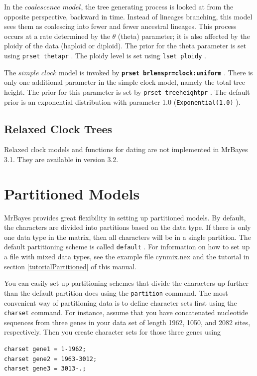 \documentclass[12pt]{book}
\newcommand{\ttt}[1]{\texttt{#1} }
\newcommand{\tb}[1]{\texttt{\textbf{#1}} }
\begin{document}
In the $coalescence$ $model$, the tree generating process is looked at from the opposite
perspective, backward in time. Instead of lineages branching, this model sees them as
coalescing into fewer and fewer ancestral lineages. This process occurs at a rate
determined by the $\theta$ (theta) parameter; it is also affected by the ploidy of the data
(haploid or diploid). The prior for the theta parameter is set using \ttt{prset thetapr}.
The ploidy level is set using \ttt{lset ploidy}.

The $simple$ $clock$ model is invoked by \tb{prset brlenspr=clock:uniform}. There is
only one additional parameter in the simple clock model, namely the total tree height.
The prior for this parameter is set by \ttt{prset treeheightpr}. The default prior is an
exponential distribution with parameter 1.0 (\ttt{Exponential(1.0)}).

\subsection{Relaxed Clock Trees}
Relaxed clock models and functions for dating are not implemented in MrBayes 3.1.
They are available in version 3.2.

\section{Partitioned Models}
MrBayes provides great flexibility in setting up partitioned models. By default, the
characters are divided into partitions based on the data type. If there is only one data type
in the matrix, then all characters will be in a single partition. The default partitioning
scheme is called \ttt{default}. For information on how to set up a file with mixed data
types, see the example file cynmix.nex and the tutorial in section \ref{tutorialPartitioned} of this manual.

You can easily set up partitioning schemes that divide the characters up further than the
default partition does using the \ttt{partition} command. The most convenient way of
partitioning data is to define character sets first using the \ttt{charset} command. For
instance, assume that you have concatenated nucleotide sequences from three genes in
your data set of length 1962, 1050, and 2082 sites, respectively. Then you create
character sets for those three genes using

\begin{singlespacing}
\small
\begin{verbatim}
charset gene1 = 1-1962;
charset gene2 = 1963-3012;
charset gene3 = 3013-.;
\end{verbatim}
\normalsize
\end{singlespacing}
\end{document}

